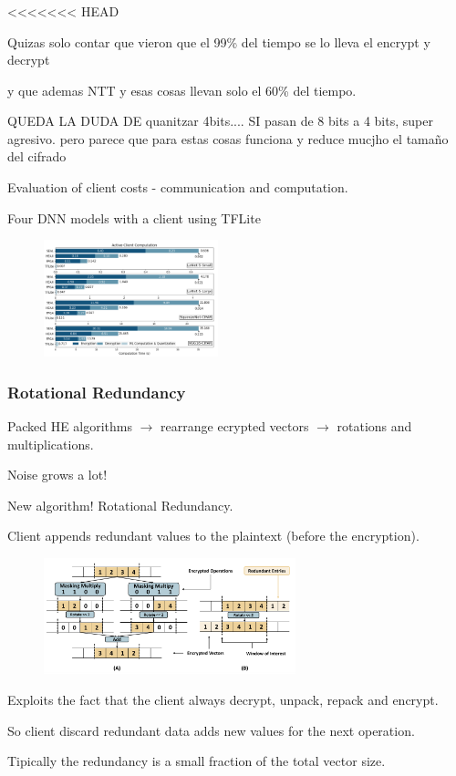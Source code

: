 \documentclass[10pt,handout]{beamer}
\begin{document}
\begin{frame}
\frametitle{}
<<<<<<< HEAD

Quizas solo contar que vieron que el 99\% del tiempo se lo lleva el encrypt y decrypt

y que ademas NTT y esas cosas llevan solo el 60\% del tiempo.

QUEDA LA DUDA DE quanitzar 4bits.... SI pasan de 8 bits a 4 bits, super agresivo.
pero parece que para estas cosas funciona y reduce mucjho el tamaño del cifrado

Evaluation of client costs - communication and computation.

Four DNN models with a client using TFLite
\begin{figure}
    \includegraphics[width=0.45\textwidth]{motivation.png}
\end{figure}



\end{frame}




\begin{frame}
\frametitle{Rotational Redundancy}

Packed HE algorithms $\rightarrow$  rearrange ecrypted vectors $\rightarrow$ rotations and multiplications.

Noise grows a lot!



New algorithm! Rotational Redundancy.

    Client appends redundant values to the plaintext (before the encryption).
\begin{figure}
    \includegraphics[width=0.65\textwidth]{rotation.png}
\end{figure}

Exploits the fact that the client  always decrypt, unpack, repack and encrypt.

So client discard redundant data adds new values for the next operation.

Tipically the redundancy is a small fraction of the total vector size.
\end{frame}
\end{document}
